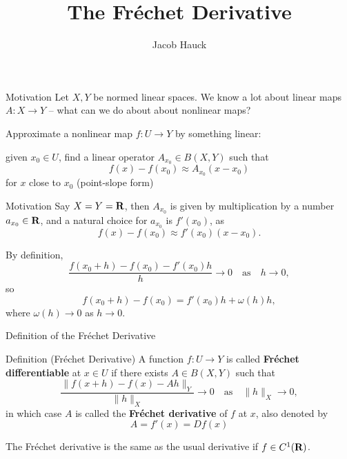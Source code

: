 \documentclass[]{beamer}
\title{The Fréchet Derivative}
\author{Jacob Hauck}
\institute{Math 6418}
\date{}
\begin{document}
	\frame{\titlepage}
	
	\begin{frame}{Motivation}
		Let $X,Y$ be normed linear spaces. We know a lot about linear maps $A : X \to Y$ -- what can we do about about nonlinear maps?
		\vfill
		\pause
		
		Approximate a nonlinear map $f : U \to Y$ by something linear:
		\pause
		
		given $x_0 \in U$, find a linear operator $A_{x_0} \in B(X,Y)$ such that
		\begin{equation*}
			f(x) - f(x_0) \approx A_{x_0}(x-x_0)
		\end{equation*}
		for $x$ close to $x_0$ (point-slope form)
		\vfill
		\pause
	\end{frame}
	
	\begin{frame}{Motivation}
		Say $X = Y = \textnormal{\bf R}$, then $A_{x_0}$ is given by multiplication by a number $a_{x_0} \in \textnormal{\bf R}$, and a natural choice for $a_{x_0}$ is $f'(x_0)$, as
		\begin{equation*}
			f(x) - f(x_0) \approx f'(x_0)(x-x_0).
		\end{equation*}
		\vfill
		\pause
		
		By definition,
		\begin{equation*}
			\frac{f(x_0+h) - f(x_0) - f'(x_0)h}{h} \to 0 \quad\text{as}\quad h\to 0,
		\end{equation*}
		\pause
		so
		\begin{equation*}
			f(x_0+h) - f(x_0) = f'(x_0)h + \omega(h)h,
		\end{equation*}
		where $\omega(h) \to 0$ as $h \to 0$.
	\end{frame}
	
	\begin{frame}{Definition of the Fréchet Derivative}
		\begin{block}{Definition (Fréchet Derivative)}
		A function $f : U \to Y$ is called \textbf{Fréchet differentiable} at $x \in U$ if there exists $A \in B(X,Y)$ such that
		\begin{equation*}
			\frac{\lVert f(x+h) - f(x) - Ah \rVert_Y}{\lVert h \rVert_X} \to 0 \quad \text{as} \quad \lVert h\rVert_X\to 0,
		\end{equation*}
		in which case $A$ is called the \textbf{Fréchet derivative} of $f$ at $x$, also denoted by
		\begin{equation*}
			A = f'(x) = Df(x)
		\end{equation*}
		\end{block}
		\vfill
		\pause
		
		The Fréchet derivative is the same as the usual derivative if $f \in C^1(\textnormal{\bf R})$.
	\end{frame}
\end{document}
